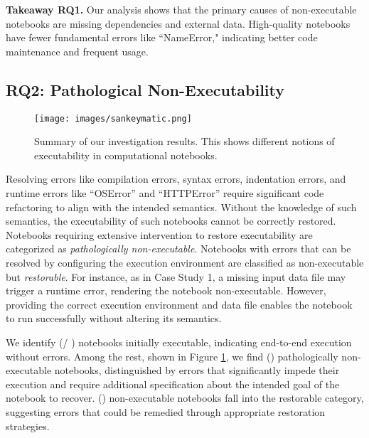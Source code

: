\begin{tcolorbox}[left=0mm, right=0mm, top=0mm, bottom=0mm]
\textbf{Takeaway RQ1.} Our analysis shows that the primary causes of non-executable notebooks are missing dependencies and external data. High-quality notebooks have fewer fundamental errors like ``NameError," indicating better code maintenance and frequent usage. %
\end{tcolorbox}

        

\subsection{RQ2: Pathological Non-Executability} 
\begin{figure}[t!] %
	\centerline{\texttt{[image: images/sankeymatic.png]}}
	\caption{Summary of our investigation results. This shows different notions of executability in computational notebooks.}
	\label{fig:overall_results}
\end{figure}
 
Resolving errors like compilation errors, syntax errors, indentation errors, and runtime errors like ``OSError'' and ``HTTPError'' require significant code refactoring to align with the intended semantics. Without the knowledge of such semantics, the executability of such notebooks cannot be correctly restored. Notebooks requiring extensive intervention to restore executability are categorized as {\em pathologically non-executable}. Notebooks with errors that can be resolved by configuring the execution environment are classified as non-executable but {\em restorable}. For instance, as in Case Study 1, a missing input data file may trigger a runtime error, rendering the notebook non-executable. However, providing the correct execution environment and data file enables the notebook to run successfully without altering its semantics. 


We identify \percentExecutable (\totalExecutable\hspace{1pt}/ \totalNotebooksInDataset) notebooks initially executable, indicating end-to-end execution without errors. Among the rest, shown in Figure \ref{fig:overall_results}, we find \totalPathological (\percentPathological) pathologically non-executable notebooks, distinguished by errors that significantly impede their execution and require additional specification about the intended goal of the notebook to recover. \totalRestorable (\percentRestorableInNonExecutable) non-executable notebooks fall into the restorable category, suggesting errors that could be remedied through appropriate restoration strategies. 


